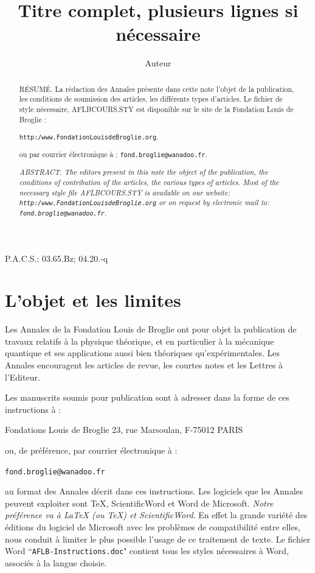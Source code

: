 \documentclass[10pt,twoside,a5paper]{article}
\title{Titre complet, plusieurs lignes si n\'ecessaire}
\author{Auteur}
\def\pacs#1{\LP P.A.C.S.: #1}
\begin{document}
\maketitle

\vskip 1cm
\begin{abstract}
R\'ESUM\'E. La r\'edaction des Annales pr\'esente dans cette note l'objet de la
publication, les conditions de soumission des articles, les diff\'erents types
d'articles. Le fichier de style n\'ecessaire, AFLBCOURS.STY est disponible sur le
site de la Fondation Louis de Broglie : 

\hfil
{\tt http:/www.FondationLouisdeBroglie.org},\hfil

 ou par courrier \'electronique \`a : 
{\tt fond.broglie@wanadoo.fr}.

{\it
ABSTRACT. The editors present in this note the object of the publication, the
conditions of contribution of the articles, the various types of articles.
Most of the necessary style file AFLBCOURS.STY is available on our website:
{\tt http:/www.FondationLouisdeBroglie.org} or on request by electronic mail to:
{\tt fond.broglie@wanadoo.fr}.}
\end{abstract}
\pacs{03.65.Bz; 04.20.-q}


\section{L'objet et les limites}

Les Annales de la Fondation Louis de Broglie ont pour objet la publication de
travaux relatifs \`a la physique th\'eorique, et en particulier \`a la m\'ecanique
quantique et ses applications aussi bien th\'eoriques qu'exp\'erimentales. Les Annales
encouragent les articles de revue, les courtes notes et les Lettres \`a l'Editeur. 


Les manuscrits soumis pour publication sont \`a adresser dans la forme de ces
instructions \`a : 

\hfil{Fondations Louis de Broglie 23, rue Marsoulan, F-75012 PARIS}
\hfil
 
\LP ou, de pr\'ef\'erence, par courrier \'electronique \`a :

\hfil{\tt fond.broglie@wanadoo.fr} \hfil

\LP au
format des Annales d\'ecrit dans ces instructions. Les logiciels que les Annales
peuvent exploiter sont \TeX, ScientificWord et Word de Microsoft. {\it Notre
pr\'ef\'erence va \`a \LaTeX{} (ou \TeX{}) et ScientificWord}. En effet la grande
vari\'et\'e des
\'editions du logiciel de Microsoft avec les probl\`emes de compatibilit\'e entre
elles, nous conduit \`a limiter le plus possible l'usage de ce traitement de
texte. Le fichier Word ``{\tt AFLB-Instructions.doc}" contient tous les styles
n\'ecessaires \`a Word, associ\'es \`a la langue choisie.
\end{document}
